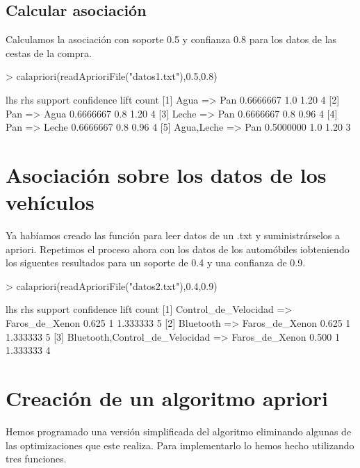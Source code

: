 \documentclass [a4paper] {article}
\begin{document}
\subsection{Calcular asociación}
Calculamos la asociación con soporte 0.5 y confianza 0.8 para los datos de las cestas de la compra.
\begin{Schunk}
\begin{Sinput}
> calapriori(readAprioriFile("datos1.txt"),0.5,0.8)
\end{Sinput}
\begin{Soutput}
    lhs             rhs     support   confidence lift count
[1] {Agua}       => {Pan}   0.6666667 1.0        1.20 4    
[2] {Pan}        => {Agua}  0.6666667 0.8        1.20 4    
[3] {Leche}      => {Pan}   0.6666667 0.8        0.96 4    
[4] {Pan}        => {Leche} 0.6666667 0.8        0.96 4    
[5] {Agua,Leche} => {Pan}   0.5000000 1.0        1.20 3    
\end{Soutput}
\end{Schunk}

\section{Asociación sobre los datos de los vehículos}
Ya habíamos creado las función para leer datos de un .txt y suministrárselos a apriori.
Repetimos el proceso ahora con los datos de los automóbiles iobteniendo los siguentes resultados para un soporte de 0.4 y una confianza de 0.9.
\begin{Schunk}
\begin{Sinput}
> calapriori(readAprioriFile("datos2.txt"),0.4,0.9)
\end{Sinput}
\begin{Soutput}
    lhs                                 rhs              support confidence lift     count
[1] {Control_de_Velocidad}           => {Faros_de_Xenon} 0.625   1          1.333333 5    
[2] {Bluetooth}                      => {Faros_de_Xenon} 0.625   1          1.333333 5    
[3] {Bluetooth,Control_de_Velocidad} => {Faros_de_Xenon} 0.500   1          1.333333 4    
\end{Soutput}
\end{Schunk}

\section{Creación de un algoritmo apriori}
Hemos programado una versión simplificada del algoritmo eliminando algunas de las optimizaciones que este realiza.
Para implementarlo lo hemos hecho utilizando tres funciones.
\end{document}
